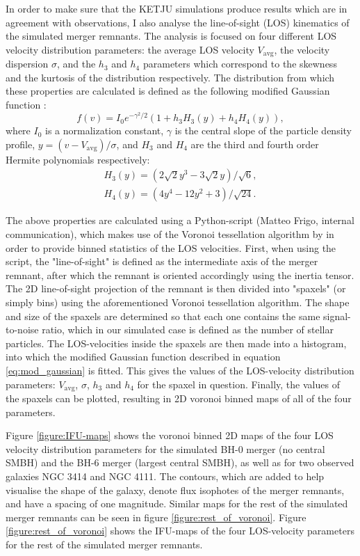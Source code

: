 \documentclass[english, oneside]{HYgradu}
\begin{document}
In order to make sure that the KETJU simulations produce results which are in agreement with observations, I  also analyse the line-of-sight (LOS) kinematics of the simulated merger remnants. The analysis is focused on four different LOS velocity distribution parameters: the average LOS velocity $V_\mathrm{avg}$, the velocity dispersion $\sigma$, and the $h_3$ and $h_4$ parameters which correspond to the skewness and the kurtosis of the distribution respectively. The distribution from which these properties are calculated is defined as the following modified Gaussian function \citep{VanDerMarel1993, Bender1994}:
\begin{equation}
f(v) = I_0 e^{-\gamma^2/2}(1 + h_3 H_3(y) + h_4 H_4(y)), 
\end{equation} 
where $I_0$ is a normalization constant, $\gamma$ is the central slope of the particle density profile, $y = (v - V_\mathrm{avg})/\sigma$, and $H_3$ and $H_4$ are the third and fourth order Hermite polynomials respectively:
\begin{eqnarray}
H_3(y) = \left(2\sqrt{2}y^3 - 3\sqrt{2}y\right) / \sqrt{6}, \\
H_4(y) = \left(4y^4 - 12y^2 + 3 \right) / \sqrt{24}.
\end{eqnarray}

The above properties are calculated using a Python-script (Matteo Frigo, internal communication), which makes use of the Voronoi tessellation algorithm by \citep{Cappellari2003} in order to provide binned statistics of the LOS velocities. First, when using the script, the "line-of-sight" is defined as the intermediate axis of the merger remnant, after which the remnant is oriented accordingly using the inertia tensor. The 2D line-of-sight projection of the remnant is then divided into "spaxels" (or simply bins) using the aforementioned Voronoi tessellation algorithm. The shape and size of the spaxels are determined so that each one contains the same signal-to-noise ratio, which in our simulated case is defined as the number of stellar particles. The LOS-velocities inside the spaxels are then made into a histogram, into which the modified Gaussian function described in equation \ref{eq:mod_gaussian} is fitted. This gives the values of the LOS-velocity distribution parameters: $V_\mathrm{avg}$, $\sigma$, $h_3$ and $h_4$ for the spaxel in question. Finally, the values of the spaxels can be plotted, resulting in 2D voronoi binned maps of all of the four parameters.

Figure \ref{figure:IFU-maps} shows the voronoi binned 2D maps of the four LOS velocity distribution parameters for the simulated BH-0 merger (no central SMBH) and the BH-6 merger (largest central SMBH), as well as for two observed galaxies NGC 3414 and NGC 4111. The contours, which are added to help visualise the shape of the galaxy, denote flux isophotes of the merger remnants, and have a spacing of one magnitude. Similar maps for the rest of the simulated merger remnants can be seen in figure \ref{figure:rest_of_voronoi}. Figure \ref{figure:rest_of_voronoi} shows the IFU-maps of the four LOS-velocity parameters for the rest of the simulated merger remnants.
\end{document}
